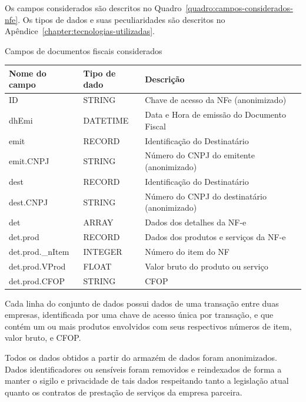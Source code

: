 Os campos considerados são descritos no Quadro~\ref{quadro:campos-considerados-nfe}. Os tipos de dados e suas peculiaridades são descritos no Apêndice~\ref{chapter:tecnologias-utilizadas}.

\begin{quadro}[htb]
\caption{Campos de documentos fiscais considerados}
\label{quadro:campos-considerados-nfe}
\centering
\begin{tabular}{|l|l|l|}        \hline
\textbf{Nome do campo} & \textbf{Tipo de dado} & \textbf{Descrição}            \\ \hline
ID               & STRING       & Chave de acesso da NFe (anonimizado)         \\ \hline
dhEmi            & DATETIME     & Data e Hora de emissão do Documento Fiscal   \\ \hline
emit             & RECORD       & Identificação do Destinatário                \\
emit.CNPJ        & STRING       & Número do CNPJ do emitente (anonimizado)     \\ \hline
dest             & RECORD       & Identificação do Destinatário                \\
dest.CNPJ        & STRING       & Número do CNPJ do destinatário (anonimizado) \\ \hline
det              & ARRAY        & Dados dos detalhes da NF-e                   \\
det.prod         & RECORD       & Dados dos produtos e serviços da NF-e        \\
det.prod.\_nItem & INTEGER      & Número do item do NF                         \\
det.prod.VProd   & FLOAT        & Valor bruto do produto ou serviço            \\
det.prod.CFOP    & STRING       & CFOP                                         \\ \hline
\end{tabular}
\end{quadro}

Cada linha do conjunto de dados possui dados de uma transação entre duas empresas, identificada por uma chave de acesso única por transação, e que contém um ou mais produtos envolvidos com seus respectivos números de item, valor bruto, e CFOP.

Todos os dados obtidos a partir do armazém de dados foram anonimizados. Dados identificadores ou sensíveis foram removidos e reindexados de forma a manter o sigilo e privacidade de tais dados respeitando tanto a legislação atual quanto os contratos de prestação de serviços da empresa parceira.

